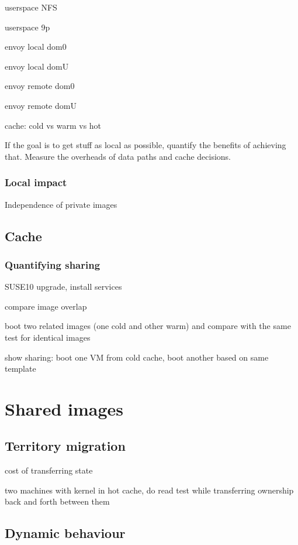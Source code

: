 userspace NFS

userspace 9p

envoy local dom0

envoy local domU

envoy remote dom0

envoy remote domU

cache: cold vs warm vs hot

If the goal is to get stuff as local as possible, quantify the benefits of achieving that. Measure the overheads of data paths and cache decisions.

\subsubsection{Local impact}

Independence of private images

\subsection{Cache}

\subsubsection{Quantifying sharing}\label{sec:quantifying-sharing}

SUSE10 upgrade, install services

compare image overlap

boot two related images (one cold and other warm) and compare with the same test for identical images

show sharing: boot one VM from cold cache, boot another based on same template

\section{Shared images}

\subsection{Territory migration}

cost of transferring state

two machines with kernel in hot cache, do read test while transferring ownership back and forth between them

\subsection{Dynamic behaviour}

